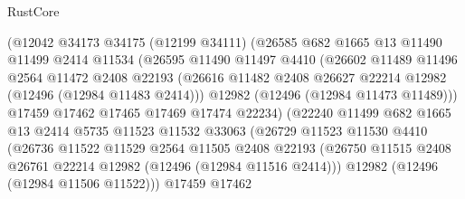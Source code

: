 \begin{lexlean}{RustCore}
\begin{coremodule}
                      (@12042
                        @34173
                        @34175
                        (@12199 @34111)
                        (@26585
                          @682
                          @1665
                          @13
                          @11490
                          @11499
                          @2414
                          @11534
                          (@26595
                            @11490
                            @11497
                            @4410
                            (@26602
                              @11489
                              @11496
                              @2564
                              @11472
                              @2408
                              @22193
                              (@26616
                                @11482
                                @2408
                                @26627
                                @22214
                                @12982
                                (@12496 (@12984 @11483 @2414)))
                              @12982
                              (@12496 (@12984 @11473 @11489)))
                            @17459
                            @17462
                            @17465
                            @17469
                            @17474
                            @22234)
                          (@22240
                            @11499
                            @682
                            @1665
                            @13
                            @2414
                            @5735
                            @11523
                            @11532
                            @33063
                            (@26729
                              @11523
                              @11530
                              @4410
                              (@26736
                                @11522
                                @11529
                                @2564
                                @11505
                                @2408
                                @22193
                                (@26750
                                  @11515
                                  @2408
                                  @26761
                                  @22214
                                  @12982
                                  (@12496 (@12984 @11516 @2414)))
                                @12982
                                (@12496 (@12984 @11506 @11522)))
                              @17459
                              @17462

\end{coremodule}
\end{lexlean}
